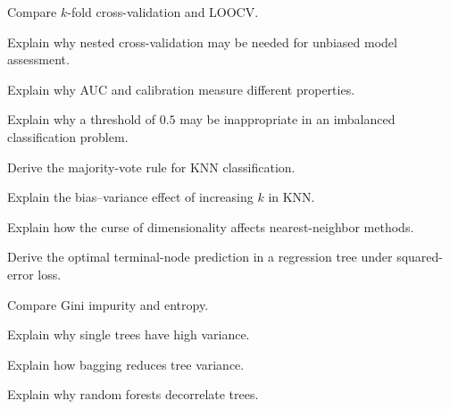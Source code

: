 \begin{exercise}[3]
Compare \(k\)-fold cross-validation and LOOCV.
\end{exercise}

\begin{exercise}[3]
Explain why nested cross-validation may be needed for unbiased model
assessment.
\end{exercise}

\begin{exercise}[3]
Explain why AUC and calibration measure different properties.
\end{exercise}

\begin{exercise}[3]
Explain why a threshold of \(0.5\) may be inappropriate in an imbalanced
classification problem.
\end{exercise}

\begin{exercise}[3]
Derive the majority-vote rule for KNN classification.
\end{exercise}

\begin{exercise}[3]
Explain the bias--variance effect of increasing \(k\) in KNN.
\end{exercise}

\begin{exercise}[3]
Explain how the curse of dimensionality affects nearest-neighbor methods.
\end{exercise}

\begin{exercise}[3]
Derive the optimal terminal-node prediction in a regression tree under
squared-error loss.
\end{exercise}

\begin{exercise}[3]
Compare Gini impurity and entropy.
\end{exercise}

\begin{exercise}[3]
Explain why single trees have high variance.
\end{exercise}

\begin{exercise}[3]
Explain how bagging reduces tree variance.
\end{exercise}

\begin{exercise}[3]
Explain why random forests decorrelate trees.
\end{exercise}

